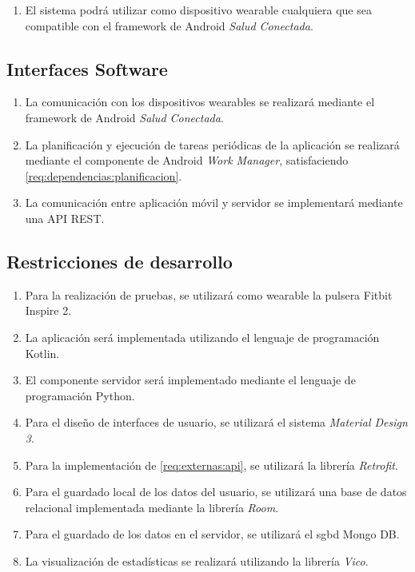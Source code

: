         \begin{enumerate}[label=\textbf{\texttt{RIS-\arabic*}}]
            \item El sistema podrá utilizar como dispositivo \gls{wearable} cualquiera que sea compatible con el \gls{framework} de Android \textit{Salud Conectada}.
        \end{enumerate}
    
    \subsection{Interfaces Software}
        \label{req:externas:software}
        \begin{enumerate}[label=\textbf{\texttt{RIS-\arabic*}}]
            \item La comunicación con los dispositivos \glspl{wearable} se realizará mediante el \gls{framework} de Android \textit{Salud Conectada}.
            \item La planificación y ejecución de tareas periódicas de la aplicación se realizará mediante el componente de Android \textit{Work Manager}, satisfaciendo \ref{req:dependencias:planificacion}.
            \item \label{req:externas:api} La comunicación entre aplicación móvil y servidor se implementará mediante una API REST.
        \end{enumerate}
    \subsection{Restricciones de desarrollo}
        \label{req:externas:restricciones}
        \begin{enumerate}[label=\textbf{\texttt{RD-\arabic*}}]
            \item Para la realización de pruebas, se utilizará como \gls{wearable} la pulsera Fitbit Inspire 2.
            \item La aplicación será implementada utilizando el lenguaje de programación Kotlin.
            \item El componente servidor será implementado mediante el lenguaje de programación Python.
            \item Para el diseño de interfaces de usuario, se utilizará el sistema \textit{Material Design 3}.
            \item Para la implementación de \ref{req:externas:api}, se utilizará la librería \textit{Retrofit}.
            \item Para el guardado local de los datos del usuario, se utilizará una base de datos relacional implementada mediante la librería \textit{Room}.
            \item Para el guardado de los datos en el servidor, se utilizará el \gls{sgbd} Mongo DB.
            \item La visualización de estadísticas se realizará utilizando la librería \textit{Vico}.
        \end{enumerate}
        